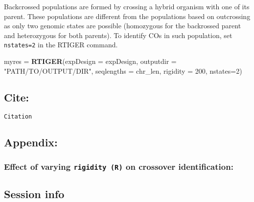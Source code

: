 \documentclass[]{article}
\newenvironment{Shaded}{\begin{snugshade}}{\end{snugshade}}
\newcommand{\DataTypeTok}[1]{\textcolor[rgb]{0.13,0.29,0.53}{#1}}
\newcommand{\DecValTok}[1]{\textcolor[rgb]{0.00,0.00,0.81}{#1}}
\newcommand{\KeywordTok}[1]{\textcolor[rgb]{0.13,0.29,0.53}{\textbf{#1}}}
\newcommand{\NormalTok}[1]{#1}
\newcommand{\StringTok}[1]{\textcolor[rgb]{0.31,0.60,0.02}{#1}}
\begin{document}
Backcrossed populations are formed by crossing a hybrid organism with
one of its parent. These populations are different from the populations
based on outcrossing as only two genomic states are possible (homozygous
for the backrossed parent and heterozygous for both parents). To
identify COs in such population, set \texttt{nstates=2} in the RTIGER
command.

\begin{Shaded}
\begin{Highlighting}[]
\NormalTok{myres =}\StringTok{ }\KeywordTok{RTIGER}\NormalTok{(}\DataTypeTok{expDesign =}\NormalTok{ expDesign, }
               \DataTypeTok{outputdir =} \StringTok{"PATH/TO/OUTPUT/DIR"}\NormalTok{,}
               \DataTypeTok{seqlengths =}\NormalTok{ chr_len,}
               \DataTypeTok{rigidity =} \DecValTok{200}\NormalTok{, }
               \DataTypeTok{nstates=}\DecValTok{2}\NormalTok{)}
\end{Highlighting}
\end{Shaded}

\hypertarget{cite}{%
\subsection{Cite:}\label{cite}}

\begin{verbatim}
Citation        
\end{verbatim}

\hypertarget{appendix}{%
\subsection{Appendix:}\label{appendix}}

\hypertarget{effect-of-varying-rigidity-r-on-crossover-identification}{%
\subsubsection{\texorpdfstring{Effect of varying \texttt{rigidity\ (R)}
on crossover
identification:}{Effect of varying rigidity (R) on crossover identification:}}\label{effect-of-varying-rigidity-r-on-crossover-identification}}

\hypertarget{session-info}{%
\subsection{Session info}\label{session-info}}
\end{document}
